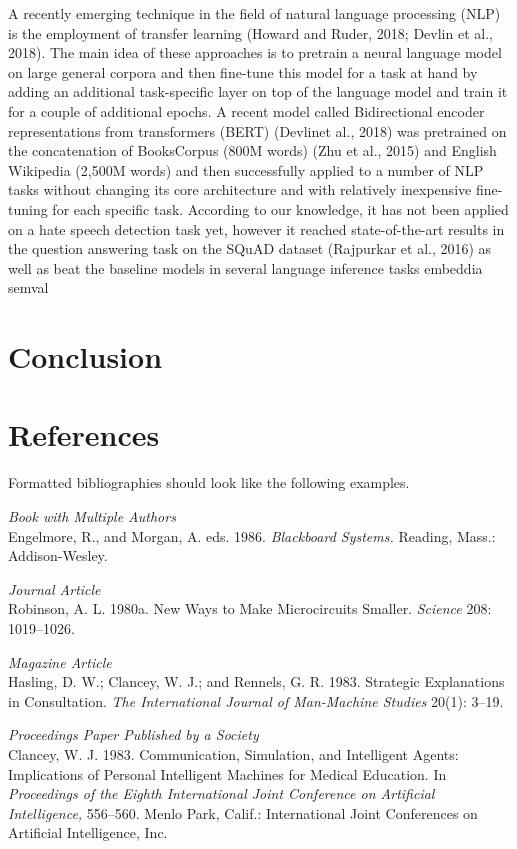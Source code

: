 \documentclass[letterpaper]{article} %
\begin{document}
A recently emerging technique in the field of natural language processing (NLP) is the employment of transfer learning (Howard and Ruder, 2018; Devlin et al., 2018). The main idea of these approaches is to pretrain a neural language model on large general corpora and then fine-tune this model for a task at hand by adding an additional task-specific layer on top of the language model and train it for a couple of additional epochs. A recent model called Bidirectional encoder representations from transformers (BERT) (Devlinet al., 2018) was pretrained on the concatenation of BooksCorpus (800M words) (Zhu et al., 2015) and English Wikipedia (2,500M words) and then successfully applied to a number of NLP tasks without changing its core architecture and with relatively inexpensive fine-tuning for each specific task. According to our knowledge, it has not been applied on a hate speech detection task yet, however it reached state-of-the-art results in the question answering task on the SQuAD dataset (Rajpurkar et al., 2016) as well as beat the baseline models in several language inference tasks embeddia semval

\bigskip
\section{Conclusion}
\bigskip
\section{References} 
Formatted bibliographies should look like the following examples.

\smallskip \noindent \textit{Book with Multiple Authors}\\
Engelmore, R., and Morgan, A. eds. 1986. \textit{Blackboard Systems.} Reading, Mass.: Addison-Wesley.

\smallskip \noindent \textit{Journal Article}\\
Robinson, A. L. 1980a. New Ways to Make Microcircuits Smaller. \textit{Science} 208: 1019--1026.

\smallskip \noindent \textit{Magazine Article}\\
Hasling, D. W.; Clancey, W. J.; and Rennels, G. R. 1983. Strategic Explanations in Consultation. \textit{The International Journal of Man-Machine Studies} 20(1): 3--19.

\smallskip \noindent \textit{Proceedings Paper Published by a Society}\\
Clancey, W. J. 1983. Communication, Simulation, and Intelligent Agents: Implications of Personal Intelligent Machines for Medical Education. In \textit{Proceedings of the Eighth International Joint Conference on Artificial Intelligence,} 556--560. Menlo Park, Calif.: International Joint Conferences on Artificial Intelligence, Inc.
\end{document}
